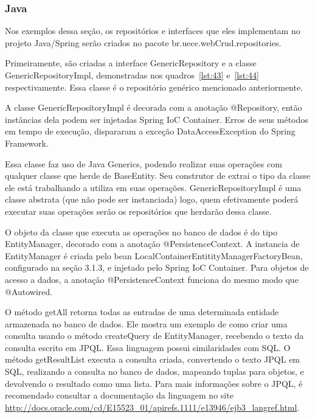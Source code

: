\documentclass[a4paper,12pt]{article}
\newcommand{\javacode}[3] {
	
	\FloatBarrier
}
\begin{document}
\subsubsection{Java}

Nos exemplos dessa seção, os repositórios e interfaces que eles implementam no projeto Java/Spring serão criados no pacote br.uece.webCrud.repositories.

Primeiramente, são criadas a interface GenericRepository e a classe GenericRepositoryImpl, demonstradas nos quadros~\ref{lst:43} e~\ref{lst:44} respectivamente. Essa classe é o repositório genérico mencionado anteriormente.

\javacode{code/43.txt}{Interface GenericRepository}{lst:43}

\javacode{code/44.txt}{Classe GenericRepositoryImpl}{lst:44}

A classe GenericRepositoryImpl é decorada com a anotação @Repository, então instâncias dela podem ser injetadas Spring IoC Container. Erros de seus métodos em tempo de execução, dispararam a exceção DataAccessException do Spring Framework.

Essa classe faz uso de Java Generics, podendo realizar suas operações com qualquer classe que herde de BaseEntity. Seu construtor de extrai o tipo da classe ele está trabalhando a utiliza em suas operações. GenericRepositoryImpl é uma classe abstrata (que não pode ser instanciada) logo, quem efetivamente poderá executar suas operações serão os repositórios que herdarão dessa classe.

O objeto da classe que executa as operações no banco de dados é do tipo EntityManager, decorado com a anotação @PersistenceContext. A instancia de EntityManager é criada pelo bean LocalContainerEntitityManagerFactoryBean, configurado na seção 3.1.3, e injetado pelo Spring IoC Container. Para objetos de acesso a dados, a anotação @PersistenceContext funciona do mesmo modo que @Autowired.

O método getAll retorna todas as entradas de uma determinada entidade armazenada no banco de dados. Ele mostra um exemplo de como criar uma consulta usando o método createQuery de EntityManager, recebendo o texto da consulta escrito em JPQL. Essa linguagem possui similaridades com SQL. O método getResultList executa a consulta criada, convertendo o texto JPQL em SQL, realizando a consulta no banco de dados, mapeando tuplas para objetos, e devolvendo o resultado como uma lista. Para mais informações sobre o JPQL, é recomendado consultar a documentação da linguagem no site \url{http://docs.oracle.com/cd/E15523_01/apirefs.1111/e13946/ejb3_langref.html}.
\end{document}
